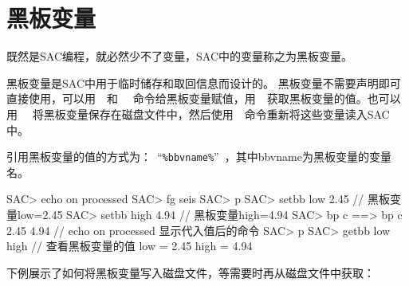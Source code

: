 \section{黑板变量}
既然是SAC编程，就必然少不了变量，SAC中的变量称之为黑板变量。

黑板变量是SAC中用于临时储存和取回信息而设计的。
黑板变量不需要声明即可直接使用，可以用~~和~~
命令给黑板变量赋值，用~~获取黑板变量的值。也可以用~~
将黑板变量保存在磁盘文件中，然后使用~~命令重新将这些变量读入SAC中。


引用黑板变量的值的方式为：~``\lstinline{%bbvname%}''~，其中bbvname为黑板变量的变量名。

\begin{SACCode}
SAC> echo on processed          
SAC> fg seis
SAC> p
SAC> setbb low 2.45         // 黑板变量low=2.45
SAC> setbb high 4.94        // 黑板变量high=4.94
SAC> bp c %
 ==>  bp c 2.45 4.94        // echo on processed 显示代入值后的命令
SAC> p
SAC> getbb low high         // 查看黑板变量的值
 low = 2.45
 high = 4.94
\end{SACCode}

下例展示了如何将黑板变量写入磁盘文件，等需要时再从磁盘文件中获取：
